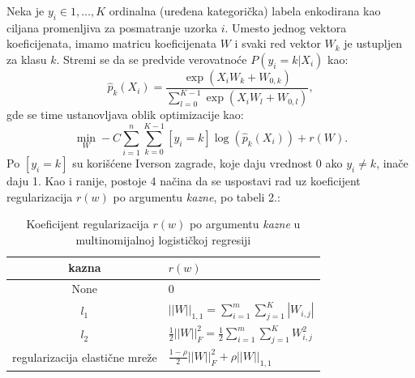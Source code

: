 \documentclass[fontsize=12bp, paper=a4]{scrarticle}
\begin{document}
Neka je $y_i \in 1,\dots,K$ ordinalna (uređena kategorička) labela enkodirana kao ciljana promenljiva za posmatranje uzorka $i$. Umesto jednog vektora koeficijenata, imamo matricu koeficijenata $W$ i svaki red vektor $W_k$ je ustupljen za klasu $k$. Stremi se da se predvide verovatnoće $P(y_i = k|X_i)$ kao:
$$\hat{p}_k(X_i) = \frac{\exp(X_i W_k + W_{0, k})}{\sum_{l=0}^{K-1} \exp(X_i W_l + W_{0, l})},$$
gde se time ustanovljava oblik optimizacije kao:
$$
\min_W -C \sum_{i=1}^n \sum_{k=0}^{K-1} [y_i = k] \log(\hat{p}_k(X_i)) + r(W).
$$
Po $[y_i = k]$ su korišćene Iverson zagrade,  koje daju vrednost $0$ ako $y_i \ne k$, inače daju 1. Kao i ranije, postoje 4 načina da se uspostavi rad uz koeficijent regularizacija $r(w)$ po argumentu \textit{kazne}, po tabeli 2.:
\begin{table}[h]
    \centering
    \begin{tabular}{cl}
        \toprule
        \textbf{kazna} & \textbf{$r(w)$} \\
        \midrule
        None & $0$ \\
        $l_1$ &  $||W||_{1,1} = \sum_{i=1}^m\sum_{j=1}^{K}|W_{i,j}|$ \\
        $l_2$ &  $\frac{1}{2}||W||_F^2 = \frac{1}{2}\sum_{i=1}^m\sum_{j=1}^{K} W_{i,j}^2$ \\
        regularizacija elastične mreže & $\frac{1 - \rho}{2}||W||_F^2 + \rho ||W||_{1,1}$ \\
        \bottomrule
    \end{tabular}
    \caption{\centering Koeficijent regularizacija $r(w)$ po argumentu \textit{kazne} u multinomijalnoj logističkoj regresiji}
\end{table}

\newpage
\end{document}
